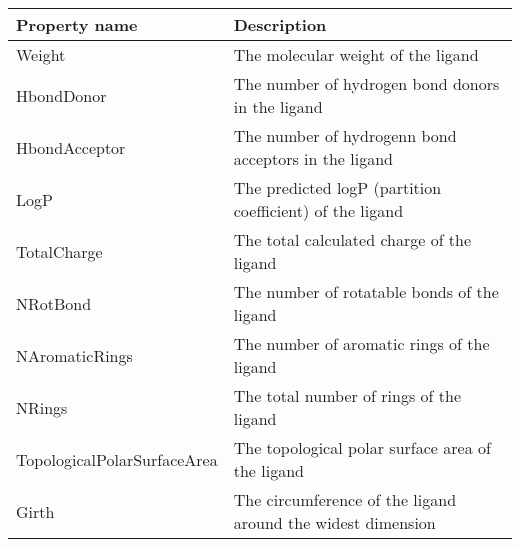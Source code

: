 \begin{tabular}{|l|l|}
\hline
\textbf{Property name} & \textbf{Description} \\
\hline
\hline
Weight & The molecular weight of the ligand\\
\hline
HbondDonor & The number of hydrogen bond donors in the ligand\\
\hline
HbondAcceptor & The number of hydrogenn bond acceptors in the ligand\\
\hline
LogP & The predicted logP (partition coefficient) of the ligand\\
\hline
TotalCharge & The total calculated charge of the ligand\\
\hline
NRotBond & The number of rotatable bonds of the ligand\\
\hline
NAromaticRings & The number of aromatic rings of the ligand\\
\hline
NRings & The total number of rings of the ligand\\
\hline
TopologicalPolarSurfaceArea & The topological polar surface area of the ligand\\
\hline
Girth & The circumference of the ligand around the widest dimension\\
\hline
\end{tabular}